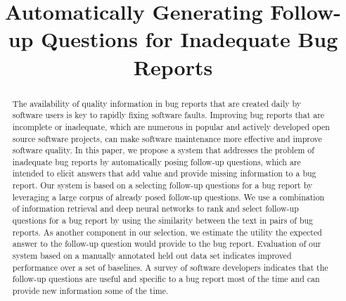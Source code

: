 \documentclass[10pt,conference]{IEEEtran}
\begin{document}
\title{Automatically Generating Follow-up Questions for Inadequate Bug Reports}

\author{
\and
{}
\and
{}
}

\maketitle

\begin{abstract}
The availability of quality information in bug reports that are created daily by software users is key
to rapidly fixing software faults.
%
%
Improving bug reports that are incomplete or inadequate, which are numerous in popular and actively developed open source software projects, can make software maintenance more effective and improve software quality.
%
In this paper, we propose a system that addresses the problem of inadequate bug reports by automatically posing follow-up questions,
which are intended to elicit answers that add value and provide missing information to a bug report.
%
Our system is based on a selecting follow-up questions for a bug report by leveraging a large corpus of already posed follow-up questions.
%
We use a combination of information retrieval and deep neural networks to rank and select
follow-up questions for a bug report by using the similarity between the text in pairs of bug
reports.
%
As another component in our selection, we estimate the utility the expected answer to the follow-up question would provide
to the bug report.
%
Evaluation of our system based on a manually annotated held out data set indicates improved
performance over a set of baselines.
%
A survey of software developers indicates that the follow-up questions are useful and specific to a bug
report most of the time and can provide new information some of the time.

\end{abstract}
\end{document}

